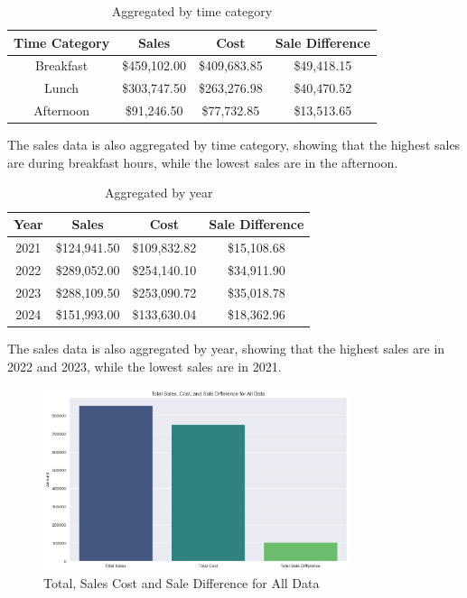 \begin{table}[H]
	\centering
	\begin{tabular}{cccc}
		\toprule
		Time Category & Sales & Cost & Sale Difference \\
		\midrule
		Breakfast & \$459,102.00 & \$409,683.85 & \$49,418.15 \\
		Lunch & \$303,747.50 & \$263,276.98 & \$40,470.52 \\
		Afternoon & \$91,246.50 & \$77,732.85 & \$13,513.65 \\
		\bottomrule
	\end{tabular}
	\caption{Aggregated by time category}
	\label{tab:aggregated_by_time_category}
\end{table}

The sales data is also aggregated by time category, showing that the highest sales are during breakfast hours, while the lowest sales are in the afternoon.

\begin{table}[H]
	\centering
	\begin{tabular}{cccc}
		\toprule
		Year & Sales & Cost & Sale Difference \\
		\midrule
		2021 & \$124,941.50 & \$109,832.82 & \$15,108.68 \\
		2022 & \$289,052.00 & \$254,140.10 & \$34,911.90 \\
		2023 & \$288,109.50 & \$253,090.72 & \$35,018.78 \\
		2024 & \$151,993.00 & \$133,630.04 & \$18,362.96 \\
		\bottomrule
	\end{tabular}
	\caption{Aggregated by year}
	\label{tab:aggregated_by_year}
\end{table}

The sales data is also aggregated by year, showing that the highest sales are in 2022 and 2023, while the lowest sales are in 2021.

\begin{figure}[H]
	\centering
	\includegraphics[width=0.8\textwidth]{assets/deep/Total Sales Cost and Sale Difference for All Data}
	\caption{Total, Sales Cost and Sale Difference for All Data}
	\label{fig:total_sales_cost_and_sale_difference_for_all_data}
\end{figure}

